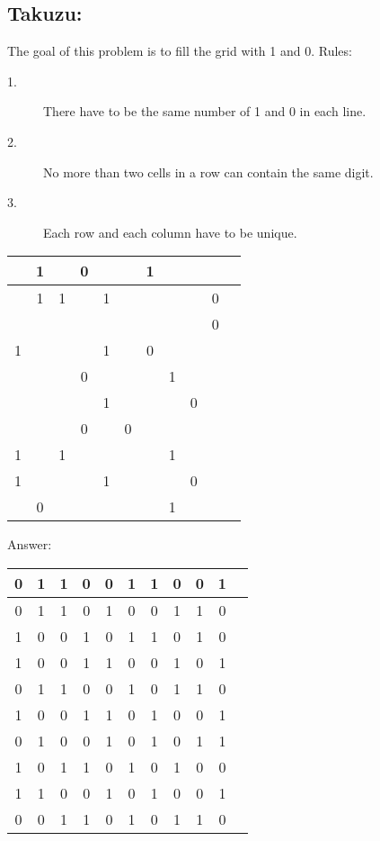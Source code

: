 \documentclass{article}
\begin{document}
\subsection*{Takuzu:}
The goal of this problem is to fill the grid with 1 and 0. 
Rules:
\begin{description}
\item[1.] There have to be the same number of 1 and 0 in each line.
\item[2.] No more than two cells in a row can contain the same digit.
\item[3.] Each row and each column have to be unique.
\end{description}

\begin{table}[ht]
\centering
\begin{tabular}{|c|c|c|c|c|c|c|c|c|c|c|}
\hline   & 1 &   & 0 &   &   & 1 &   &   &   \\ 
\hline   & 1 & 1 &   & 1 &   &   &   &   & 0 \\ 
\hline   &   &   &   &   &   &   &   &   & 0 \\ 
\hline 1 &   &   &   & 1 &   & 0 &   &   &   \\ 
\hline   &   &   & 0 &   &   &   & 1 &   &   \\ 
\hline   &   &   &   & 1 &   &   &   & 0 &   \\ 
\hline   &   &   & 0 &   & 0 &   &   &   &   \\ 
\hline 1 &   & 1 &   &   &   &   & 1 &   &   \\ 
\hline 1 &   &   &   & 1 &   &   &   & 0 &   \\ 
\hline   & 0 &   &   &   &   &   & 1 &   &   \\
\hline
\end{tabular}
\end{table} 

Answer:
\begin{table}[ht]
\centering
\begin{tabular}{|c|c|c|c|c|c|c|c|c|c|c|}
\hline 0 & 1 & 1 & 0 & 0 & 1 & 1 & 0 & 0 & 1 \\ 
\hline 0 & 1 & 1 & 0 & 1 & 0 & 0 & 1 & 1 & 0 \\ 
\hline 1 & 0 & 0 & 1 & 0 & 1 & 1 & 0 & 1 & 0 \\ 
\hline 1 & 0 & 0 & 1 & 1 & 0 & 0 & 1 & 0 & 1 \\ 
\hline 0 & 1 & 1 & 0 & 0 & 1 & 0 & 1 & 1 & 0 \\ 
\hline 1 & 0 & 0 & 1 & 1 & 0 & 1 & 0 & 0 & 1 \\ 
\hline 0 & 1 & 0 & 0 & 1 & 0 & 1 & 0 & 1 & 1 \\ 
\hline 1 & 0 & 1 & 1 & 0 & 1 & 0 & 1 & 0 & 0 \\ 
\hline 1 & 1 & 0 & 0 & 1 & 0 & 1 & 0 & 0 & 1 \\ 
\hline 0 & 0 & 1 & 1 & 0 & 1 & 0 & 1 & 1 & 0 \\
\hline
\end{tabular}
\end{table} 
\end{document}
